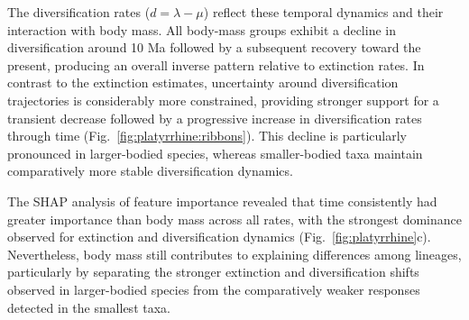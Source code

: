 The diversification rates ($d = \lambda - \mu$) reflect these temporal dynamics and their interaction with body mass.
All body-mass groups exhibit a decline in diversification around 10 Ma followed by a subsequent recovery toward the present, producing an overall inverse pattern relative to extinction rates.
In contrast to the extinction estimates, uncertainty around diversification trajectories is considerably more constrained, providing stronger support for a transient decrease followed by a progressive increase in diversification rates through time (Fig.~\ref{fig:platyrrhine:ribbons}).
This decline is particularly pronounced in larger-bodied species, whereas smaller-bodied taxa maintain comparatively more stable diversification dynamics.

The SHAP analysis of feature importance revealed that time consistently had greater importance than body mass across all rates, with the strongest dominance observed for extinction and diversification dynamics (Fig.~\ref{fig:platyrrhine}c). Nevertheless, body mass still contributes to explaining differences among lineages, particularly by separating the stronger extinction and diversification shifts observed in larger-bodied species from the comparatively weaker responses detected in the smallest taxa.